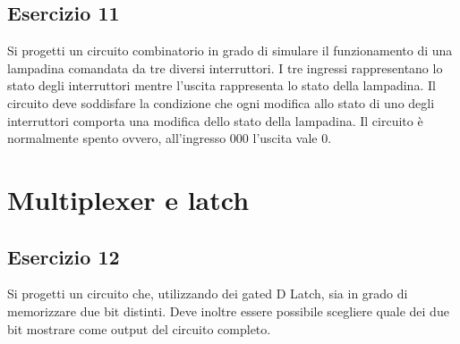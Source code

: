 \documentclass{article}
\begin{document}
\subsection*{Esercizio 11}
Si progetti un circuito combinatorio in grado di simulare il funzionamento di una lampadina comandata da tre diversi interruttori. I tre ingressi rappresentano lo stato degli interruttori mentre l’uscita rappresenta lo stato della lampadina. Il circuito deve soddisfare la condizione che ogni modifica allo stato di uno degli interruttori comporta una modifica dello stato della lampadina. Il circuito è normalmente spento ovvero, all'ingresso 000 l'uscita vale 0.

\section*{Multiplexer e latch}
\subsection*{Esercizio 12}
Si progetti un circuito che, utilizzando dei gated D Latch, sia in grado di memorizzare due bit distinti. Deve inoltre essere possibile scegliere quale dei due bit mostrare come output del circuito completo.
\end{document}
